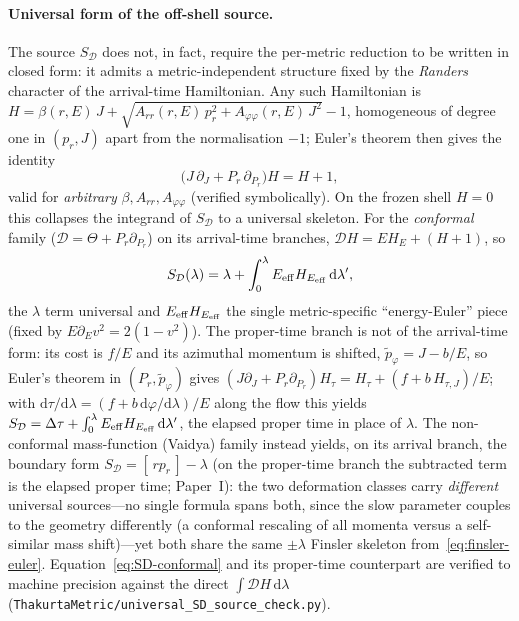 \documentclass[12pt]{iopart}
\theoremstyle{plain}
\theoremstyle{definition}
\theoremstyle{remark}
\newcommand{\dd}{\mathrm{d}}
\begin{document}
\paragraph{Universal form of the off-shell source.} The source $S_{\mathcal D}$ does
not, in fact, require the per-metric reduction to be written in closed form: it admits
a metric-independent structure fixed by the \emph{Randers} character of the
arrival-time Hamiltonian. Any such Hamiltonian is
$H=\beta(r,E)\,J+\sqrt{A_{rr}(r,E)\,p_r^2+A_{\varphi\varphi}(r,E)\,J^2}-1$, homogeneous
of degree one in $(p_r,J)$ apart from the normalisation $-1$; Euler's theorem then
gives the identity
\begin{equation}
    \big(J\,\partial_J+P_r\,\partial_{P_r}\big)H=H+1,
    \label{eq:finsler-euler}
\end{equation}
valid for \emph{arbitrary} $\beta,A_{rr},A_{\varphi\varphi}$ (verified symbolically).
On the frozen shell $H=0$ this collapses the integrand of $S_{\mathcal D}$ to a
universal skeleton. For the \emph{conformal} family ($\mathcal D=\Theta+P_r\partial_{P_r}$) on
its arrival-time branches, $\mathcal D H=E H_E+(H+1)$, so
\begin{equation}
    S_{\mathcal D}(\lambda)=\lambda+\int_0^{\lambda}E_{\rm eff}H_{E_{\rm eff}}\,\dd\lambda',
    \label{eq:SD-conformal}
\end{equation}
the $\lambda$ term universal and $E_{\rm eff}H_{E_{\rm eff}}$ the single
metric-specific ``energy-Euler'' piece (fixed by $E\partial_E v^2=2(1-v^2)$). The
proper-time branch is not of the arrival-time form: its cost is $f/E$ and its azimuthal
momentum is shifted, $\tilde p_\varphi=J-b/E$, so Euler's theorem in $(P_r,\tilde p_\varphi)$ gives
$(J\partial_J+P_r\partial_{P_r})H_\tau=H_\tau+(f+b\,H_{\tau,J})/E$; with
$\dd\tau/\dd\lambda=(f+b\,\dd\varphi/\dd\lambda)/E$ along the flow this yields
$S_{\mathcal D}=\Delta\tau+\int_0^{\lambda}E_{\rm eff}H_{E_{\rm eff}}\,\dd\lambda'$, the elapsed proper
time in place of $\lambda$. The
non-conformal mass-function (Vaidya) family instead yields, on its arrival branch, the
boundary form $S_{\mathcal D}=[\,rp_r\,]-\lambda$ (on the proper-time branch the subtracted
term is the elapsed proper time; Paper~I): the two deformation classes carry
\emph{different} universal sources---no single formula spans both, since the slow
parameter couples to the geometry differently (a conformal rescaling of all momenta
versus a self-similar mass shift)---yet both share the same $\pm\lambda$ Finsler skeleton
from~\eqref{eq:finsler-euler}. Equation~\eqref{eq:SD-conformal} and its proper-time
counterpart are verified to machine precision against the direct $\int\mathcal D H\,\dd\lambda$
(\texttt{ThakurtaMetric/universal\_SD\_source\_check.py}).
\end{document}
